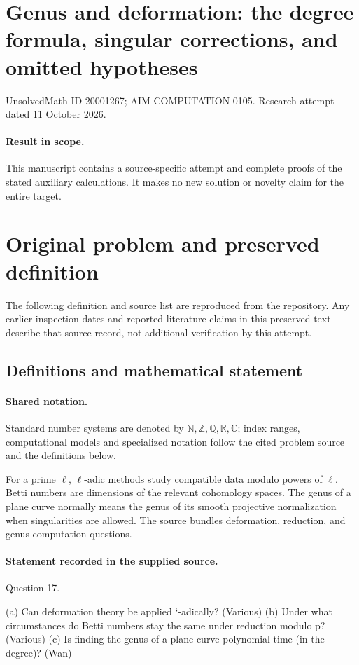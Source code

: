 \documentclass[11pt]{article}
\begin{document}
\section*{Genus and deformation: the degree formula, singular corrections, and omitted hypotheses}
\noindent UnsolvedMath ID 20001267; AIM-COMPUTATION-0105. Research attempt dated 11 October 2026.
\paragraph{Result in scope.}This manuscript contains a source-specific attempt and complete proofs of the stated auxiliary calculations. It makes no new solution or novelty claim for the entire target.
\section{Original problem and preserved definition}
The following definition and source list are reproduced from the repository. Any earlier inspection dates and reported literature claims in this preserved text describe that source record, not additional verification by this attempt.
\subsection{Definitions and mathematical statement}

\paragraph{Shared notation.}Standard number systems are denoted by $\mathbb N,\mathbb Z,\mathbb Q,\mathbb R,\mathbb C$; index ranges, computational models and specialized notation follow the cited problem source and the definitions below.


For a prime $\ell$, $\ell$-adic methods study compatible data modulo powers of $\ell$. Betti numbers are dimensions of the relevant cohomology spaces. The genus of a plane curve normally means the genus of its smooth projective normalization when singularities are allowed. The source bundles deformation, reduction, and genus-computation questions.
\paragraph{Statement recorded in the supplied source.}
Question 17.

(a) Can deformation theory be applied `-adically? (Various) (b) Under what circumstances do Betti numbers stay the same under reduction modulo p?(Various) (c) Is finding the genus of a plane curve polynomial time (in the degree)? (Wan)
\end{document}
